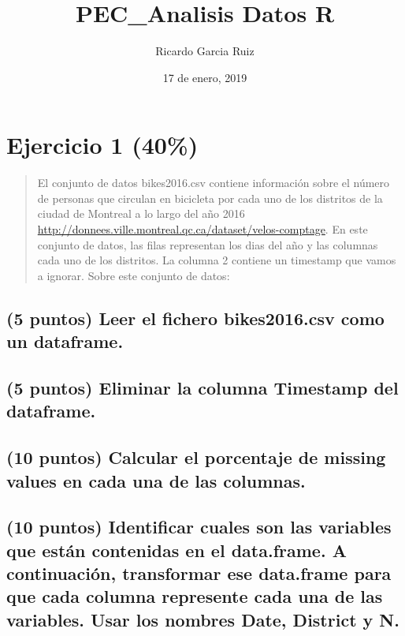 \documentclass[]{article}
\title{PEC\_Analisis Datos R}
\author{Ricardo Garcia Ruiz}
\date{17 de enero, 2019}
\begin{document}
\maketitle

{
\setcounter{tocdepth}{4}
\tableofcontents
}
\section{Ejercicio 1 (40\%)}\label{ejercicio-1-40}

\begin{quote}
El conjunto de datos bikes2016.csv contiene información sobre el número
de personas que circulan en bicicleta por cada uno de los distritos de
la ciudad de Montreal a lo largo del año 2016
\url{http://donnees.ville.montreal.qc.ca/dataset/velos-comptage}. En
este conjunto de datos, las filas representan los dias del año y las
columnas cada uno de los distritos. La columna 2 contiene un timestamp
que vamos a ignorar. Sobre este conjunto de datos:
\end{quote}

\subsection{(5 puntos) Leer el fichero bikes2016.csv como un
dataframe.}\label{puntos-leer-el-fichero-bikes2016.csv-como-un-dataframe.}

\subsection{\texorpdfstring{(5 puntos) Eliminar la columna
\textbf{Timestamp} del
dataframe.}{(5 puntos) Eliminar la columna Timestamp del dataframe.}}\label{puntos-eliminar-la-columna-timestamp-del-dataframe.}

\subsection{(10 puntos) Calcular el porcentaje de missing values en cada
una de las
columnas.}\label{puntos-calcular-el-porcentaje-de-missing-values-en-cada-una-de-las-columnas.}

\subsection{(10 puntos) Identificar cuales son las variables que están
contenidas en el data.frame. A continuación, transformar ese data.frame
para que cada columna represente cada una de las variables. Usar los
nombres Date, District y
N.}\label{puntos-identificar-cuales-son-las-variables-que-estan-contenidas-en-el-data.frame.-a-continuacion-transformar-ese-data.frame-para-que-cada-columna-represente-cada-una-de-las-variables.-usar-los-nombres-date-district-y-n.}
\end{document}
